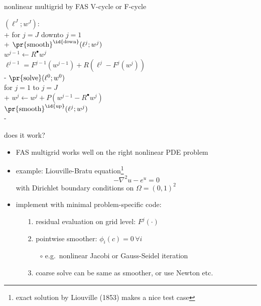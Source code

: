 \documentclass[svgnames,
               hyperref={colorlinks,citecolor=DeepPink4,linkcolor=FireBrick,urlcolor=Maroon},
               usepdftitle=false]  %
               {beamer}
\newcommand{\iR}{R^{\bullet}}
\begin{document}
\begin{frame}{nonlinear multigrid by FAS V-cycle or F-cycle}
{\small
\begin{pseudo}
$(\ell^J;w^J)$: \\+
    for $j=J$ downto $j=1$ \\+
      $\text{\pr{smooth}}^{\text{\id{down}}}(\ell^j; w^j)$ \\
      $w^{j-1} \gets \iR w^j$ \\
      $\ell^{j-1} = F^{j-1}(w^{j-1}) + R \left(\ell^j - F^j(w^j)\right)$ \\-
    $\text{\pr{solve}}(\ell^0;w^0)$ \\
    for $j=1$ to $j=J$ \\+
      $w^j \gets w^j + P (w^{j-1} - \iR w^j)$ \\
      $\text{\pr{smooth}}^{\text{\id{up}}}(\ell^j;w^j)$ \\-
\end{pseudo}
}
\end{frame}


\begin{frame}{does it work?}

\begin{itemize}
\item FAS multigrid works well on the right nonlinear PDE problem
\item example: Liouville-Bratu equation\footnote{exact solution by Liouville (1853) makes a nice test case}
    $$-\nabla^2 u - e^u = 0$$
with Dirichlet boundary conditions on $\Omega=(0,1)^2$
\item implement with minimal problem-specific code:
    \begin{enumerate}
    \item[1.] residual evaluation on grid level: $F^j(\cdot)$
    \item[2.] pointwise smoother: $\phi_i(c) = 0 \,\forall i$
        \begin{itemize}
        \item[$\circ$] e.g.~nonlinear Jacobi or Gauss-Seidel iteration
        \end{itemize}
    \item[3.] coarse solve can be same as smoother, or use Newton etc.
    \end{enumerate}
\end{itemize}
\end{frame}
\end{document}
